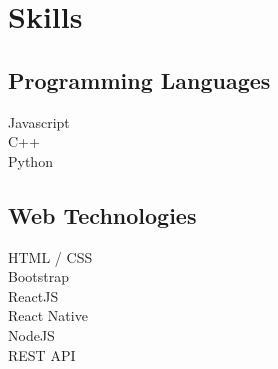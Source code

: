 \documentclass[]{deedy-resume-openfont}
\begin{document}
\begin{minipage}[t]{0.33\textwidth}




\section{Skills}
\subsection{Programming Languages}
\textbullet{} Javascript \\
\textbullet{} C++ \\
\textbullet{} Python
\subsection{Web Technologies}
\textbullet{} HTML / CSS \\
\textbullet{} Bootstrap \\
\textbullet{} ReactJS \\ 
\textbullet{} React Native \\
\textbullet{} NodeJS \\
\textbullet{} REST API

\end{minipage}
\end{document}
